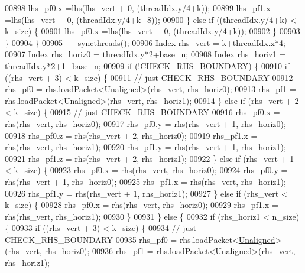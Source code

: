 \begin{DoxyCode}
00898           lhs\_pf0.x =lhs(lhs\_vert + 0, (threadIdx.y/4+k));
00899           lhs\_pf1.x =lhs(lhs\_vert + 0, (threadIdx.y/4+k+8));
00900         \} \textcolor{keywordflow}{else} \textcolor{keywordflow}{if} ((threadIdx.y/4+k) < k\_size) \{
00901           lhs\_pf0.x =lhs(lhs\_vert + 0, (threadIdx.y/4+k));
00902         \}
00903       \}
00904     \}
00905     \_\_syncthreads();
00906     Index rhs\_vert = k+threadIdx.x*4;
00907     Index rhs\_horiz0 = threadIdx.y*2+base\_n;
00908     Index rhs\_horiz1 = threadIdx.y*2+1+base\_n;
00909     \textcolor{keywordflow}{if} (!CHECK\_RHS\_BOUNDARY) \{
00910       \textcolor{keywordflow}{if} ((rhs\_vert + 3) < k\_size) \{
00911         \textcolor{comment}{// just CHECK\_RHS\_BOUNDARY}
00912         rhs\_pf0 = rhs.loadPacket<\hyperlink{group__enums_gga45fe06e29902b7a2773de05ba27b47a1ac935220b4c844108e183ebe30a4d5204}{Unaligned}>(rhs\_vert, rhs\_horiz0);
00913         rhs\_pf1 = rhs.loadPacket<\hyperlink{group__enums_gga45fe06e29902b7a2773de05ba27b47a1ac935220b4c844108e183ebe30a4d5204}{Unaligned}>(rhs\_vert, rhs\_horiz1);
00914       \} \textcolor{keywordflow}{else} \textcolor{keywordflow}{if} (rhs\_vert + 2 < k\_size) \{
00915         \textcolor{comment}{// just CHECK\_RHS\_BOUNDARY}
00916         rhs\_pf0.x = rhs(rhs\_vert, rhs\_horiz0);
00917         rhs\_pf0.y = rhs(rhs\_vert + 1, rhs\_horiz0);
00918         rhs\_pf0.z = rhs(rhs\_vert + 2, rhs\_horiz0);
00919         rhs\_pf1.x = rhs(rhs\_vert, rhs\_horiz1);
00920         rhs\_pf1.y = rhs(rhs\_vert + 1, rhs\_horiz1);
00921         rhs\_pf1.z = rhs(rhs\_vert + 2, rhs\_horiz1);
00922       \} \textcolor{keywordflow}{else} \textcolor{keywordflow}{if} (rhs\_vert + 1 < k\_size) \{
00923         rhs\_pf0.x = rhs(rhs\_vert, rhs\_horiz0);
00924         rhs\_pf0.y = rhs(rhs\_vert + 1, rhs\_horiz0);
00925         rhs\_pf1.x = rhs(rhs\_vert, rhs\_horiz1);
00926         rhs\_pf1.y = rhs(rhs\_vert + 1, rhs\_horiz1);
00927       \} \textcolor{keywordflow}{else} \textcolor{keywordflow}{if} (rhs\_vert  < k\_size) \{
00928         rhs\_pf0.x = rhs(rhs\_vert, rhs\_horiz0);
00929         rhs\_pf1.x = rhs(rhs\_vert, rhs\_horiz1);
00930       \}
00931     \} \textcolor{keywordflow}{else} \{
00932       \textcolor{keywordflow}{if} (rhs\_horiz1 < n\_size) \{
00933         \textcolor{keywordflow}{if} ((rhs\_vert + 3) < k\_size) \{
00934           \textcolor{comment}{// just CHECK\_RHS\_BOUNDARY}
00935           rhs\_pf0 = rhs.loadPacket<\hyperlink{group__enums_gga45fe06e29902b7a2773de05ba27b47a1ac935220b4c844108e183ebe30a4d5204}{Unaligned}>(rhs\_vert, rhs\_horiz0);
00936           rhs\_pf1 = rhs.loadPacket<\hyperlink{group__enums_gga45fe06e29902b7a2773de05ba27b47a1ac935220b4c844108e183ebe30a4d5204}{Unaligned}>(rhs\_vert, rhs\_horiz1);

\end{DoxyCode}
